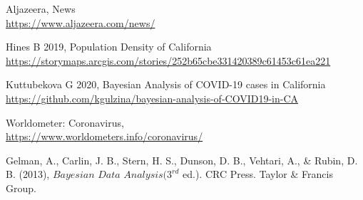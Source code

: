 \documentclass[11pt,twocolumn]{asaproc}
\begin{document}
\begin{references}
\itemsep=0pt
{\footnotesize

\item
Aljazeera, News
\\\url{https://www.aljazeera.com/news/}

\item
Hines B 2019, Population Density of California
\\\url{https://storymaps.arcgis.com/stories/252b65cbe331420389c61453c61ea221}

\item
Kuttubekova G 2020, Bayesian Analysis of COVID-19 cases in California
\\\url{https://github.com/kgulzina/bayesian-analysis-of-COVID19-in-CA}

\item 
Worldometer: Coronavirus,
\\\url{https://www.worldometers.info/coronavirus/}


\item 
Gelman, A., Carlin, J. B., Stern, H. S., Dunson, D. B., Vehtari, A., \& Rubin, D. B. (2013), $\textit{Bayesian Data Analysis} (3^{rd}$ ed.). CRC Press. Taylor \& Francis Group.



}
\end{references}
\end{document}
